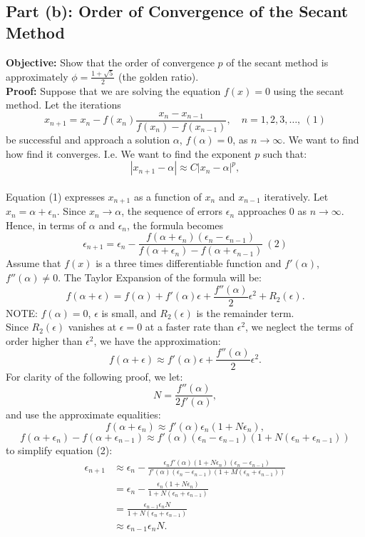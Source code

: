 \documentclass[12pt]{article}
\begin{document}
\subsection*{Part (b): Order of Convergence of the Secant Method}

\textbf{Objective:} Show that the order of convergence \( p \) of the secant method is approximately \( \phi = \frac{1 + \sqrt{5}}{2} \) (the golden ratio).
\\
\textbf{Proof: }
Suppose that we are solving the equation \( f(x) = 0 \) using the secant method. Let the iterations
\[
    x_{n+1} = x_n - f(x_n) \frac{x_n - x_{n-1}}{f(x_n) - f(x_{n-1})}, \quad n = 1, 2, 3, \ldots, \ (1)
\]
be successful and approach a solution \( \alpha \), \( f(\alpha) = 0 \), as \( n \to \infty \). We want to find how find it converges. 
I.e. We want to find the exponent \( p \) such that:
\[
    |x_{n+1} - \alpha| \approx C |x_n - \alpha|^p,
\]
\\
Equation (1) expresses \( x_{n+1} \) as a function of \( x_n \) and \( x_{n-1} \) iteratively.
Let \( x_n = \alpha + \epsilon_n \). Since \( x_n \to \alpha \), the sequence of errors \( \epsilon_n \) approaches 0 as \( n \to \infty \). Hence, in terms of \( \alpha \) and \( \epsilon_n \), the formula becomes
\[
    \epsilon_{n+1} = \epsilon_n - \frac{f(\alpha + \epsilon_n)(\epsilon_n - \epsilon_{n-1})}{f(\alpha + \epsilon_n) - f(\alpha + \epsilon_{n-1})} \ (2)
\]
Assume that \( f(x) \) is a three times differentiable function and \( f'(\alpha) \), \( f''(\alpha) \neq 0 \). The Taylor Expansion of the formula will be:
\[
    f(\alpha + \epsilon) = f(\alpha) + f'(\alpha) \epsilon + \frac{f''(\alpha)}{2} \epsilon^2 + R_2(\epsilon).
\]
NOTE: \( f(\alpha) = 0 \), \( \epsilon \) is small, and \( R_2(\epsilon) \) is the remainder term. 
\\
Since \( R_2(\epsilon) \) vanishes at \( \epsilon = 0 \) at a faster rate than \( \epsilon^2 \), we neglect the terms of order higher than \( \epsilon^2 \), we have the approximation:
\[
    f(\alpha + \epsilon) \approx f'(\alpha) \epsilon + \frac{f''(\alpha)}{2} \epsilon^2.
\]
For clarity of the following proof, we let:
\[
    N = \frac{f''(\alpha)}{2 f'(\alpha)},
\]
and use the approximate equalities:
\[
    f(\alpha + \epsilon_n) \approx f'(\alpha) \epsilon_n (1 + N \epsilon_n),
\]
\[
    f(\alpha + \epsilon_n) - f(\alpha + \epsilon_{n-1}) \approx f'(\alpha)(\epsilon_n - \epsilon_{n-1})(1 + N(\epsilon_n + \epsilon_{n-1}))
\]
to simplify equation (2):
\begin{align*}
    \epsilon_{n+1} &\approx \epsilon_n - \frac{\epsilon_n f'(\alpha)(1 + N \epsilon_n)(\epsilon_n - \epsilon_{n-1})}{f'(\alpha)(\epsilon_n - \epsilon_{n-1})(1 + M (\epsilon_n + \epsilon_{n-1}))} \\
    &= \epsilon_n - \frac{\epsilon_n (1 + N \epsilon_n)}{1 + N (\epsilon_n + \epsilon_{n-1})} \\
    &= \frac{\epsilon_{n-1} \epsilon_n N}{1 + N (\epsilon_n + \epsilon_{n-1})} \\
    &\approx \epsilon_{n-1} \epsilon_n N.
\end{align*}
\end{document}
